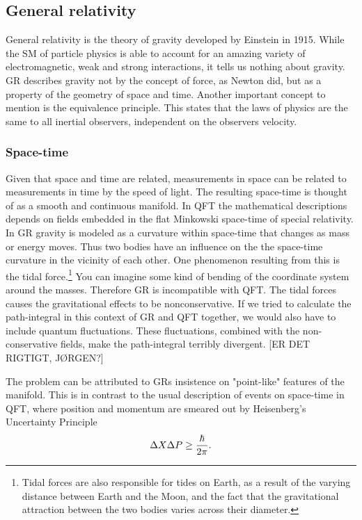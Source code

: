 \subsection{General relativity}
General relativity is the theory of gravity developed by Einstein in 1915. While the SM of particle physics is able to account for an amazing variety of electromagnetic, weak and strong interactions, it tells us nothing about gravity. GR describes gravity not by the concept of force, as Newton did, but as a property of the geometry of space and time. Another important concept to mention is the equivalence principle. This states that the laws of physics are the same to all inertial observers, independent on the observers velocity.

\subsubsection{Space-time}
Given that space and time are related, measurements in space can be related to measurements in time by the speed of light. The resulting space-time is thought of as a smooth and continuous manifold. In QFT the mathematical descriptions depends on fields embedded in the flat Minkowski space-time of special relativity. In GR gravity is modeled as a curvature within space-time that changes as mass or energy moves. Thus two bodies have an influence on the the space-time curvature in the vicinity of each other. One phenomenon resulting from this is the tidal force.\footnote{Tidal forces are also responsible for tides on Earth, as a result of the varying distance between Earth and the Moon, and the fact that the gravitational attraction between the two bodies varies across their diameter.} You can imagine some kind of bending of the coordinate system around the masses. Therefore GR is incompatible with QFT. The tidal forces causes the gravitational effects to be nonconservative. If we tried to calculate the path-integral in this context of GR and QFT together, we would also have to include quantum fluctuations. These fluctuations, combined with the non-conservative fields, make the path-integral terribly divergent. [ER DET RIGTIGT, JØRGEN?]

The problem can be attributed to GRs insistence on "point-like" features of the manifold. This is in contrast to the usual description of events on space-time in QFT, where position and momentum are smeared out by Heisenberg's Uncertainty Principle
\begin{equation} \label{eq:heisenberg}
	\Delta X \Delta P \geq {\hbar \over 2 \pi}.
\end{equation}

